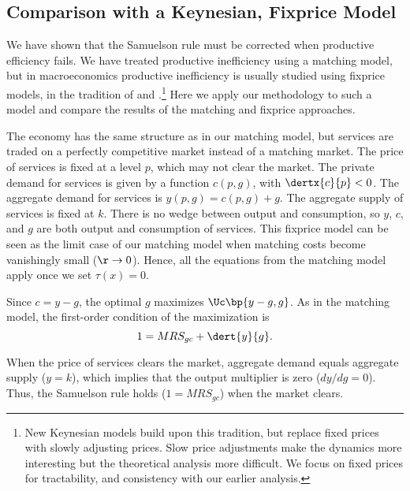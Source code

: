 \documentclass[letterpaper,12pt,leqno]{article}
\begin{document}
\begin{bibunit}
\subsection{Comparison with a Keynesian, Fixprice Model}\label{sec:fixprice}

We have shown that the Samuelson rule must be corrected when productive efficiency fails. We have treated productive inefficiency using a matching model, but in macroeconomics productive inefficiency is usually studied using fixprice models, in the tradition of  and .\footnote{New Keynesian models build upon this tradition, but replace fixed prices with slowly adjusting prices. Slow price adjustments make the dynamics more interesting but the theoretical analysis more difficult. We focus on fixed prices for tractability, and consistency with our earlier analysis.} Here we apply our methodology to such a model and compare the results of the matching and fixprice approaches.

The economy has the same structure as in our matching model, but services are traded on a perfectly competitive market instead of a matching market. The price of services is fixed at a level $p$, which may not clear the market. The private demand for services is given by a function $c(p,g)$, with $\dertx{c}{p}<0$. The aggregate demand for services is $y(p,g) = c(p,g)+g$. The aggregate supply of services is fixed at $k$. There is no wedge between output and consumption, so $y$, $c$, and $g$ are both output and consumption of services. This fixprice model can be seen as the limit case of our matching model when matching costs become vanishingly small ($\r\to 0$). Hence, all the equations from the matching model apply once we set $\tau(x)=0$.

Since $c=y-g$, the optimal $g$ maximizes $\Uc\bp{y-g,g}$. As in the matching model, the first-order condition of the maximization is 
\begin{equation}
1 = MRS_{gc}+\dert{y}{g}.
\label{eq:exact2}\end{equation}

When the price of services clears the market, aggregate demand equals aggregate supply ($y = k$), which implies that the output multiplier is zero ($dy/dg=0$). Thus, the Samuelson rule holds ($1=MRS_{gc}$) when the market clears.


\end{bibunit}
\end{document}
